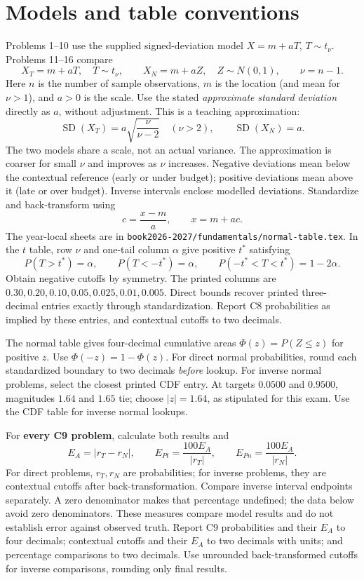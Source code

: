 \section*{Models and table conventions}
Problems 1--10 use the supplied signed-deviation model $X=m+aT$, $T\sim t_\nu$.
Problems 11--16 compare
\[
 X_T=m+aT,\quad T\sim t_\nu,\qquad X_N=m+aZ,\quad Z\sim N(0,1),
 \qquad \boxed{\nu=n-1}.
\]
Here $n$ is the number of sample observations, $m$ is the location (and mean for $\nu>1$), and $a>0$ is the scale.
Use the stated \emph{approximate standard deviation} directly as $a$, without adjustment.
This is a teaching approximation:
\[
 \operatorname{SD}(X_T)=a\sqrt{\frac{\nu}{\nu-2}}\quad(\nu>2),
 \qquad \operatorname{SD}(X_N)=a.
\]
The two models share a scale, not an actual variance. The approximation is coarser for small $\nu$ and improves as $\nu$ increases.
Negative deviations mean below the contextual reference (early or under budget); positive deviations mean above it (late or over budget).
Inverse intervals enclose modelled deviations. Standardize and back-transform using
\[
 \boxed{c=\frac{x-m}{a}},\qquad \boxed{x=m+ac}.
\]
The year-local sheets are in \texttt{book2026-2027/fundamentals/normal-table.tex}.
In the $t$ table, row $\nu$ and one-tail column $\alpha$ give positive $t^*$ satisfying
\[
 P(T>t^*)=\alpha,\qquad P(T<-t^*)=\alpha,\qquad
 P(-t^*<T<t^*)=1-2\alpha.
\]
Obtain negative cutoffs by symmetry. The printed columns are
$0.30,0.20,0.10,0.05,0.025,0.01,0.005$.
Direct bounds recover printed three-decimal entries exactly through standardization.
Report C8 probabilities as implied by these entries, and contextual cutoffs to two decimals.

The normal table gives four-decimal cumulative areas $\Phi(z)=P(Z\le z)$ for positive $z$.
Use $\Phi(-z)=1-\Phi(z)$. For direct normal probabilities, round each standardized boundary to two decimals \emph{before} lookup.
For inverse normal problems, select the closest printed CDF entry.
At targets $0.0500$ and $0.9500$, magnitudes $1.64$ and $1.65$ tie; choose $|z|=1.64$, as stipulated for this exam.
Use the CDF table for inverse normal lookups.

For \textbf{every C9 problem}, calculate both results and
\[
 E_A=|r_T-r_N|,\qquad E_{Pt}=\frac{100E_A}{|r_T|},\qquad
 E_{Pn}=\frac{100E_A}{|r_N|}.
\]
For direct problems, $r_T,r_N$ are probabilities; for inverse problems, they are contextual cutoffs after back-transformation.
Compare inverse interval endpoints separately.
A zero denominator makes that percentage undefined; the data below avoid zero denominators.
These measures compare model results and do not establish error against observed truth.
Report C9 probabilities and their $E_A$ to four decimals; contextual cutoffs and their $E_A$ to two decimals with units; and percentage comparisons to two decimals.
Use unrounded back-transformed cutoffs for inverse comparisons, rounding only final results.

